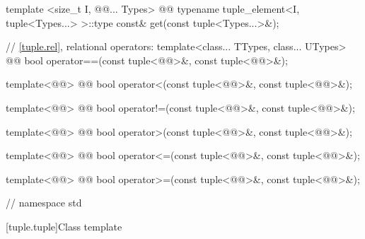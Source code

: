 \documentclass[american,twoside]{book}
\begin{document}
\begin{codeblock}
{  template <size_t I, @@... Types>
    @@
    typename tuple_element<I, tuple<Types...> >::type const& get(const tuple<Types...>&);

  // \ref{tuple.rel}, relational operators:
  template<class... TTypes, class... UTypes>
    @@
    bool operator==(const tuple<@@>&, const tuple<@@>&);

  template<@@>
    @@
    bool operator<(const tuple<@@>&, const tuple<@@>&);

  template<@@>
    @@
    bool operator!=(const tuple<@@>&, const tuple<@@>&);

  template<@@>
    @@
    bool operator>(const tuple<@@>&, const tuple<@@>&);

  template<@@>
    @@
    bool operator<=(const tuple<@@>&, const tuple<@@>&);

  template<@@>
    @@
    bool operator>=(const tuple<@@>&, const tuple<@@>&);

} // namespace std
\end{codeblock}

[tuple.tuple]{Class template }
\end{document}
